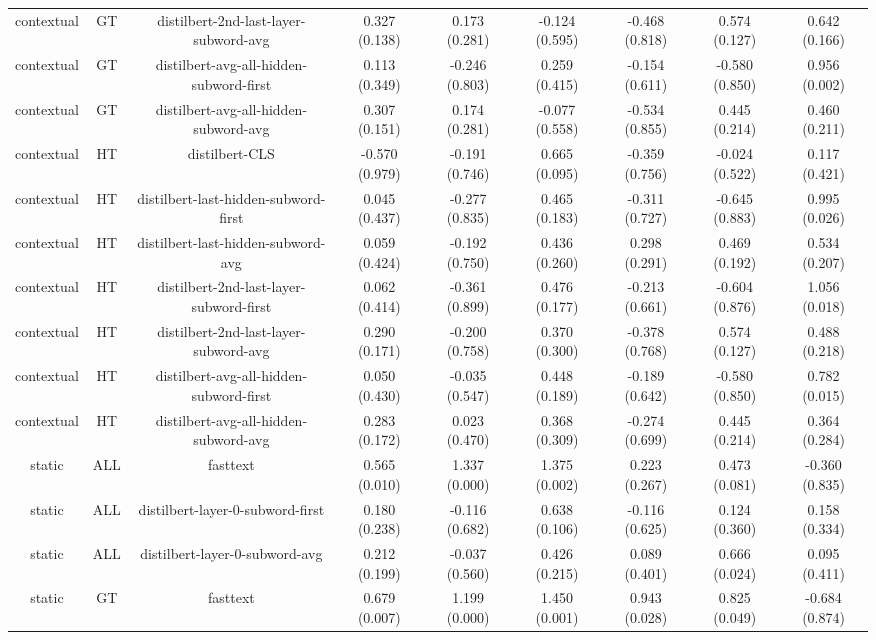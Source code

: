 \begin{sidewaystable}[htb]
\begin{tabular}{@{}ccccccccc@{}}
        contextual & GT & distilbert-2nd-last-layer-subword-avg & 0.327 (0.138) & 0.173 (0.281) & -0.124 (0.595) & -0.468 (0.818) & 0.574 (0.127) & 0.642 (0.166) \\
        contextual & GT & distilbert-avg-all-hidden-subword-first & 0.113 (0.349) & -0.246 (0.803) & 0.259 (0.415) & -0.154 (0.611) & -0.580 (0.850) & 0.956 (0.002) \\
        contextual & GT & distilbert-avg-all-hidden-subword-avg & 0.307 (0.151) & 0.174 (0.281) & -0.077 (0.558) & -0.534 (0.855) & 0.445 (0.214) & 0.460 (0.211) \\
        contextual & HT & distilbert-CLS & -0.570 (0.979) & -0.191 (0.746) & 0.665 (0.095) & -0.359 (0.756) & -0.024 (0.522) & 0.117 (0.421) \\
        contextual & HT & distilbert-last-hidden-subword-first & 0.045 (0.437) & -0.277 (0.835) & 0.465 (0.183) & -0.311 (0.727) & -0.645 (0.883) & 0.995 (0.026) \\
        contextual & HT & distilbert-last-hidden-subword-avg & 0.059 (0.424) & -0.192 (0.750) & 0.436 (0.260) & 0.298 (0.291) & 0.469 (0.192) & 0.534 (0.207) \\
        contextual & HT & distilbert-2nd-last-layer-subword-first & 0.062 (0.414) & -0.361 (0.899) & 0.476 (0.177) & -0.213 (0.661) & -0.604 (0.876) & 1.056 (0.018) \\
        contextual & HT & distilbert-2nd-last-layer-subword-avg & 0.290 (0.171) & -0.200 (0.758) & 0.370 (0.300) & -0.378 (0.768) & 0.574 (0.127) & 0.488 (0.218) \\
        contextual & HT & distilbert-avg-all-hidden-subword-first & 0.050 (0.430) & -0.035 (0.547) & 0.448 (0.189) & -0.189 (0.642) & -0.580 (0.850) & 0.782 (0.015) \\
        contextual & HT & distilbert-avg-all-hidden-subword-avg & 0.283 (0.172) & 0.023 (0.470) & 0.368 (0.309) & -0.274 (0.699) & 0.445 (0.214) & 0.364 (0.284) \\
        static & ALL & fasttext & 0.565 (0.010) & 1.337 (0.000) & 1.375 (0.002) & 0.223 (0.267) & 0.473 (0.081) & -0.360 (0.835) \\
        static & ALL & distilbert-layer-0-subword-first & 0.180 (0.238) & -0.116 (0.682) & 0.638 (0.106) & -0.116 (0.625) & 0.124 (0.360) & 0.158 (0.334) \\
        static & ALL & distilbert-layer-0-subword-avg & 0.212 (0.199) & -0.037 (0.560) & 0.426 (0.215) & 0.089 (0.401) & 0.666 (0.024) & 0.095 (0.411) \\
        static & GT & fasttext & 0.679 (0.007) & 1.199 (0.000) & 1.450 (0.001) & 0.943 (0.028) & 0.825 (0.049) & -0.684 (0.874) \\

\end{tabular}
\end{sidewaystable}

